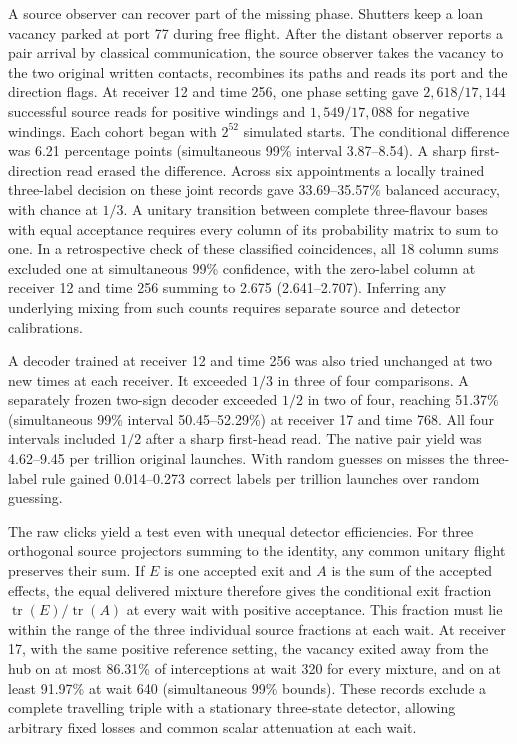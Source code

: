 \documentclass[11pt]{article}
\begin{document}
A source observer can recover part of the missing phase. Shutters keep
a loan vacancy parked at port 77 during free flight. After the distant
observer reports a pair arrival by classical communication, the source
observer takes the vacancy to the two original written contacts,
recombines its paths and reads its port and the direction flags. At receiver 12
and time 256, one phase setting gave $2{,}618/17{,}144$ successful
source reads for positive windings and $1{,}549/17{,}088$ for negative
windings. Each cohort began with $2^{52}$ simulated starts. The
conditional difference was 6.21 percentage points (simultaneous 99\%
interval 3.87--8.54). A sharp first-direction read erased the
difference. Across six appointments a locally trained three-label
decision on these joint records gave 33.69--35.57\% balanced
accuracy, with chance at $1/3$. A unitary transition between complete
three-flavour bases with equal acceptance requires every column of its
probability matrix to sum to one. In a retrospective check of these
classified coincidences, all 18 column sums excluded one at simultaneous
99\% confidence, with the zero-label column at receiver 12 and time 256
summing to 2.675 (2.641--2.707). Inferring any underlying mixing from
such counts requires separate source and detector calibrations.

A decoder trained at receiver 12 and time 256 was also tried unchanged
at two new times at each receiver.
It exceeded $1/3$ in three of four comparisons. A separately frozen
two-sign decoder exceeded $1/2$ in two of four, reaching 51.37\%
(simultaneous 99\% interval 50.45--52.29\%) at receiver 17 and time
768. All four intervals included $1/2$ after a sharp first-head read. The native pair yield was
4.62--9.45 per trillion original launches. With random guesses on
misses the three-label rule gained 0.014--0.273 correct labels per
trillion launches over random guessing.

The raw clicks yield a test even with unequal detector efficiencies.
For three orthogonal source projectors summing to the identity, any
common unitary flight preserves their sum. If $E$ is one accepted
exit and $A$ is the sum of the accepted effects, the equal delivered
mixture therefore gives the conditional exit fraction
$\operatorname{tr}(E)/\operatorname{tr}(A)$ at every wait with positive
acceptance. This fraction must lie within the range of the three
individual source fractions at each wait. At receiver 17, with the
same positive reference setting, the vacancy exited away from the hub
on at most 86.31\% of interceptions at wait 320 for every mixture, and
on at least 91.97\% at wait 640 (simultaneous 99\% bounds). These
records exclude a complete travelling triple with a stationary
three-state detector, allowing arbitrary fixed losses and common scalar
attenuation at each wait.
\end{document}
